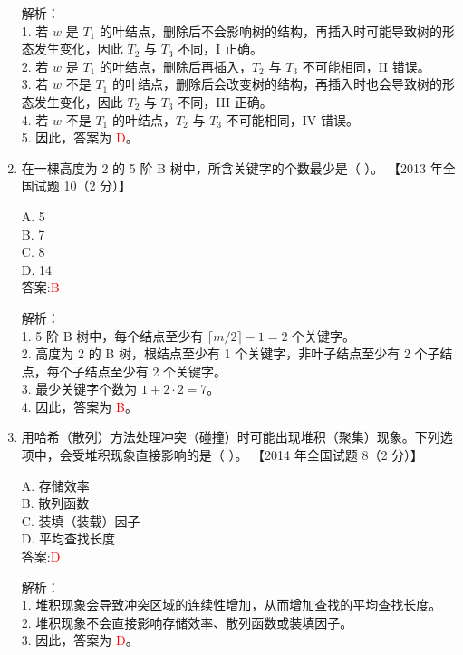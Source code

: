 \documentclass[lang=cn,newtx,10pt,scheme=chinese]{../../../elegantbook}
\begin{document}
\begin{enumerate}
    解析：\\
    1. 若 $w$ 是 $T_1$ 的叶结点，删除后不会影响树的结构，再插入时可能导致树的形态发生变化，因此 $T_2$ 与 $T_3$ 不同，I 正确。\\
    2. 若 $w$ 是 $T_1$ 的叶结点，删除后再插入，$T_2$ 与 $T_3$ 不可能相同，II 错误。\\
    3. 若 $w$ 不是 $T_1$ 的叶结点，删除后会改变树的结构，再插入时也会导致树的形态发生变化，因此 $T_2$ 与 $T_3$ 不同，III 正确。\\
    4. 若 $w$ 不是 $T_1$ 的叶结点，$T_2$ 与 $T_3$ 不可能相同，IV 错误。\\
    5. 因此，答案为 \textcolor{red}{D}。\\

\item 在一棵高度为 2 的 5 阶 B 树中，所含关键字的个数最少是（ ）。  
    【2013 年全国试题 10（2 分）】  

    A. 5 \\  
    B. 7 \\  
    C. 8 \\  
    D. 14 \\  

    答案:\textcolor{red}{B}

    解析：\\
    1. 5 阶 B 树中，每个结点至少有 $\lceil m/2 \rceil - 1 = 2$ 个关键字。\\
    2. 高度为 2 的 B 树，根结点至少有 1 个关键字，非叶子结点至少有 2 个子结点，每个子结点至少有 2 个关键字。\\
    3. 最少关键字个数为 $1 + 2 \cdot 2 = 7$。\\
    4. 因此，答案为 \textcolor{red}{B}。\\

\item 用哈希（散列）方法处理冲突（碰撞）时可能出现堆积（聚集）现象。下列选项中，会受堆积现象直接影响的是（ ）。  
    【2014 年全国试题 8（2 分）】  

    A. 存储效率 \\  
    B. 散列函数 \\  
    C. 装填（装载）因子 \\  
    D. 平均查找长度 \\  

    答案:\textcolor{red}{D}

    解析：\\
    1. 堆积现象会导致冲突区域的连续性增加，从而增加查找的平均查找长度。\\
    2. 堆积现象不会直接影响存储效率、散列函数或装填因子。\\
    3. 因此，答案为 \textcolor{red}{D}。\\


\end{enumerate}
\end{document}
